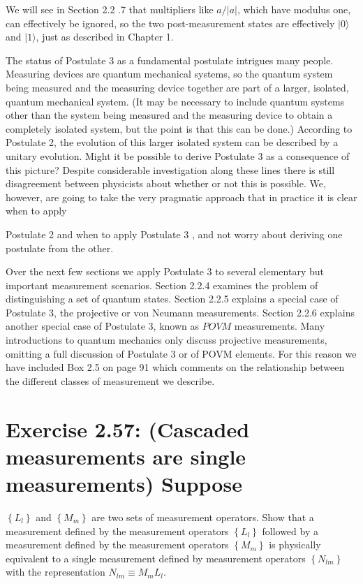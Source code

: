 \documentclass[10pt]{article}
\begin{document}
We will see in Section 2.2 .7 that multipliers like $a /|a|$, which have modulus one, can effectively be ignored, so the two post-measurement states are effectively $|0\rangle$ and $|1\rangle$, just as described in Chapter 1.

The status of Postulate 3 as a fundamental postulate intrigues many people. Measuring devices are quantum mechanical systems, so the quantum system being measured and the measuring device together are part of a larger, isolated, quantum mechanical system. (It may be necessary to include quantum systems other than the system being measured and the measuring device to obtain a completely isolated system, but the point is that this can be done.) According to Postulate 2, the evolution of this larger isolated system can be described by a unitary evolution. Might it be possible to derive Postulate 3 as a consequence of this picture? Despite considerable investigation along these lines there is still disagreement between physicists about whether or not this is possible. We, however, are going to take the very pragmatic approach that in practice it is clear when to apply

Postulate 2 and when to apply Postulate 3 , and not worry about deriving one postulate from the other.

Over the next few sections we apply Postulate 3 to several elementary but important measurement scenarios. Section 2.2.4 examines the problem of distinguishing a set of quantum states. Section 2.2.5 explains a special case of Postulate 3, the projective or von Neumann measurements. Section 2.2.6 explains another special case of Postulate 3, known as $P O V M$ measurements. Many introductions to quantum mechanics only discuss projective measurements, omitting a full discussion of Postulate 3 or of POVM elements. For this reason we have included Box 2.5 on page 91 which comments on the relationship between the different classes of measurement we describe.

\section*{Exercise 2.57: (Cascaded measurements are single measurements) Suppose}
$\left\{L_{l}\right\}$ and $\left\{M_{m}\right\}$ are two sets of measurement operators. Show that a measurement defined by the measurement operators $\left\{L_{l}\right\}$ followed by a measurement defined by the measurement operators $\left\{M_{m}\right\}$ is physically equivalent to a single measurement defined by measurement operators $\left\{N_{l m}\right\}$ with the representation $N_{l m} \equiv M_{m} L_{l}$.
\end{document}
